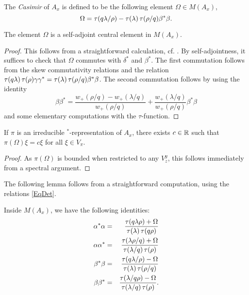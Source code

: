 \begin{Def} The \emph{Casimir} of $A_x$ is defined to be the following element $\Omega\in M(A_x)$, \[\Omega = \operatorname{\tau}(q\lambda/\rho) - \operatorname{\tau}(\lambda)\operatorname{\tau}(\rho/q)\beta^*\beta.\]  
\end{Def}

\begin{Lem} The element $\Omega$ is a self-adjoint central element in $M(A_x)$.
\end{Lem}
\begin{proof}
This follows from a straightforward calculation, cf. \cite[Lemma 3.3]{KoR1}. By self-adjointness, it suffices to check that $\Omega$ commutes with $\delta^*$ and $\beta^*$. The first commutation follows from the skew commutativity relations and the relation $\operatorname{\tau}(q\lambda)\operatorname{\tau}(\rho)\gamma\gamma^* =\operatorname{\tau}(\lambda)\operatorname{\tau}(\rho/q)\beta^*\beta$. The second commutation follows by using the identity \[\beta\beta^* =  \frac{w_+(\rho/q)-w_+(\lambda/q)}{w_+(\rho/q)} + \frac{w_+(\lambda/q)}{w_+(\rho/q)}\beta^*\beta\] and some elementary computations with the $\tau$-function.
\end{proof}

\begin{Cor}\label{CorCas} If $\pi$ is an irreducible $^*$-representation of $A_x$, there exists $c\in \mathbb{R}$ such that $\pi(\Omega)\xi = c\xi$ for all $\xi \in V_{\pi}$. 
\end{Cor} 
\begin{proof} As $\pi(\Omega)$ is bounded when restricted to any $V^y_z$, this follows immediately from a spectral argument. 
\end{proof} 

The following lemma follows from a straightforward computation, using the relations \eqref{EqDet}.

\begin{Lem}\label{LemAmp} Inside $M(A_x)$, we have the following identities:
\begin{eqnarray*}
\alpha^*\alpha &=& \frac{\operatorname{\tau}(q\lambda\rho)+\Omega}{\operatorname{\tau}(\lambda)\operatorname{\tau}(q\rho)}\\
\alpha\alpha^* &=& \frac{\operatorname{\tau}(\lambda\rho/q)+\Omega}{\operatorname{\tau}(\lambda/q)\operatorname{\tau}(\rho)}\\ 
\beta^*\beta &=& \frac{\operatorname{\tau}(q\lambda/\rho)-\Omega}{\operatorname{\tau}(\lambda)\operatorname{\tau}(\rho/q)}\\
\beta\beta^* &=&  \frac{\operatorname{\tau}(\lambda/q\rho)-\Omega}{\operatorname{\tau}(\lambda/q)\operatorname{\tau}(\rho)}.
\end{eqnarray*}
\end{Lem}

